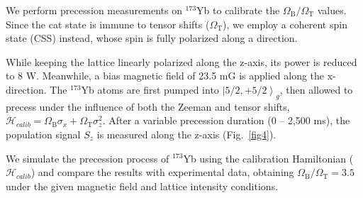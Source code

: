 \documentclass[pdflatex,sn-nature,centre]{sn-jnl}%
\begin{document}
We perform precession measurements on $^{173}$Yb to calibrate the $\Omega_{\mathrm B}/\Omega_{\mathrm T}$ values. Since the cat state is immune to tensor shifts ($\Omega_{\mathrm T}$), we employ a coherent spin state (CSS) instead, whose spin is fully polarized along a direction.


While keeping the lattice linearly polarized along the z-axis, its power is reduced to 8 W. Meanwhile, a bias magnetic field of 23.5 mG is applied along the x-direction. The $^{173}$Yb atoms are first pumped into $\left\vert5/2,+5/2\right\rangle_g$, then allowed to precess under the influence of both the Zeeman and tensor shifts, $\mathscr{H}_{calib} = \Omega_{\mathrm B}\sigma_x + \Omega_{\mathrm T}\sigma_z^2$. After a variable precession duration (0 – 2,500 ms), the population signal $S_z$ is measured along the z-axis (Fig.~\ref{fig4}). 



We simulate the precession process of $^{173}$Yb using the calibration Hamiltonian ($\mathscr{H}_{calib}$) and compare the results with experimental data, obtaining $\Omega_{\mathrm B}/\Omega_{\mathrm T}=3.5$ under the given magnetic field and lattice intensity conditions.

\end{document}
